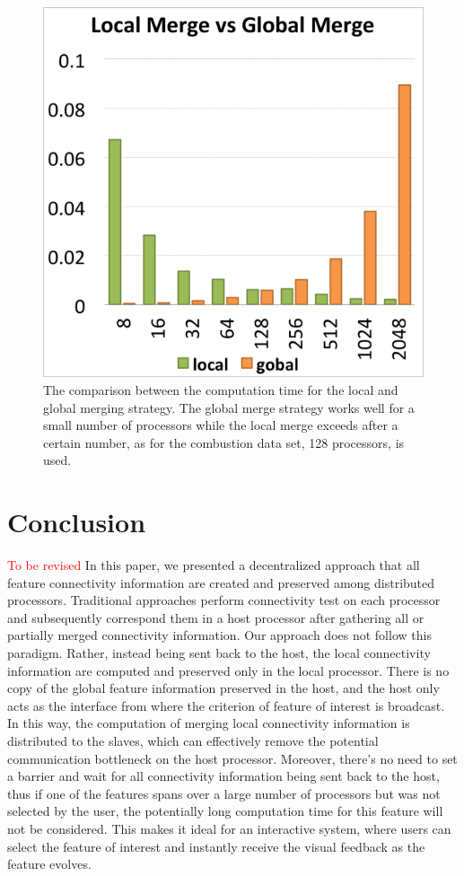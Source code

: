 \documentclass[10pt, conference, compsocconf]{IEEEtran}
\begin{document}
\begin{figure}[ht]
	\centering
	\includegraphics[width=0.45\linewidth]{local_vs_global.png}
	\caption{The comparison between the computation time for the local and global merging strategy. The global merge strategy works well for a small number of processors while the local merge exceeds after a certain number, as for the combustion data set, 128 processors, is used.}
	\label{fig:local-vs-global}
\end{figure}


\section{Conclusion}
\textcolor{red}{To be revised}
In this paper, we presented a decentralized approach that all feature connectivity information are created and preserved among distributed processors. Traditional approaches perform connectivity test on each processor and subsequently correspond them in a host processor after gathering all or partially merged connectivity information. Our approach does not follow this paradigm. Rather, instead being sent back to the host, the local connectivity information are computed and preserved only in the local processor.
There is no copy of the global feature information preserved in the host, and the host only acts as the interface from where the criterion of feature of interest is broadcast. In this way, the computation of merging local connectivity information is distributed to the slaves, which can effectively remove the potential communication bottleneck on the host processor.
Moreover, there's no need to set a barrier and wait for all connectivity information being sent back to the host, thus if one of the features spans over a large number of processors but was not selected by the user, the potentially long computation time for this feature will not be considered. This makes it ideal for an interactive system, where users can select the feature of interest and instantly receive the visual feedback as the feature evolves.





\end{document}
